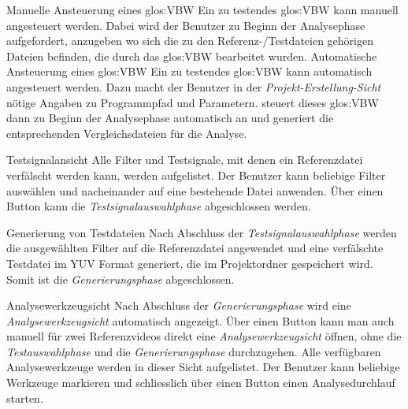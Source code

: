  Manuelle Ansteuerung eines \gls{glos:VBW}
\newline
Ein zu testendes \gls{glos:VBW} kann manuell angesteuert werden. Dabei wird der Benutzer zu Beginn der Analysephase aufgefordert, anzugeben wo sich die zu den Referenz-/Testdateien gehörigen Dateien befinden, die durch das \gls{glos:VBW} bearbeitet wurden.
 Automatische Ansteuerung eines \gls{glos:VBW}
\newline
Ein zu testendes \gls{glos:VBW} kann automatisch angesteuert werden. Dazu macht der Benutzer in der \emph{Projekt-Erstellung-Sicht} nötige Angaben zu Programmpfad und Parametern. \projektTitel steuert dieses \gls{glos:VBW} dann zu Beginn der Analysephase automatisch an und generiert die entsprechenden Vergleichsdateien für die Analyse.



 Testsignalansicht
\newline
Alle Filter und Testsignale, mit denen ein Referenzdatei verfälscht werden kann, werden aufgelistet. Der Benutzer kann beliebige Filter auswählen und nacheinander auf eine bestehende Datei anwenden. Über einen Button kann die \emph{Testsignalauswahlphase} abgeschlossen werden.

 Generierung von Testdateien
\newline
Nach Abschluss der \emph{Testsignalauswahlphase} werden die ausgewählten Filter auf die Referenzdatei angewendet und eine verfälschte Testdatei im YUV Format generiert, die im Projektordner gespeichert wird. Somit ist die \emph{Generierungsphase} abgeschlossen.





 Analysewerkzeugsicht
\newline
Nach Abschluss der \emph{Generierungsphase} wird eine \emph{Analysewerkzeugsicht} automatisch angezeigt. Über einen Button kann man auch manuell für zwei Referenzvideos direkt eine \emph{Analysewerkzeugsicht} öffnen, ohne die \emph{Testauswahlphase} und die \emph{Generierungsphase} durchzugehen. Alle verfügbaren Analysewerkzeuge werden in dieser Sicht aufgelistet. Der Benutzer kann beliebige Werkzeuge markieren und schliesslich über einen Button einen Analysedurchlauf starten.

